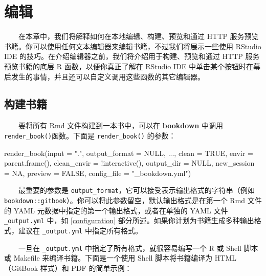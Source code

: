 \documentclass[
  12pt,
]{krantz}
\newenvironment{Shaded}{\begin{snugshade}}{\end{snugshade}}
\newcommand{\AttributeTok}[1]{\textcolor[rgb]{0.77,0.63,0.00}{#1}}
\newcommand{\ConstantTok}[1]{\textcolor[rgb]{0.00,0.00,0.00}{#1}}
\newcommand{\FunctionTok}[1]{\textcolor[rgb]{0.00,0.00,0.00}{#1}}
\newcommand{\NormalTok}[1]{#1}
\newcommand{\SpecialCharTok}[1]{\textcolor[rgb]{0.00,0.00,0.00}{#1}}
\newcommand{\StringTok}[1]{\textcolor[rgb]{0.31,0.60,0.02}{#1}}
\theoremstyle{definition}
\theoremstyle{definition}
\theoremstyle{definition}
\theoremstyle{definition}
\theoremstyle{remark}
\begin{document}
\hypertarget{editing}{%
\chapter{编辑}\label{editing}}

  在本章中，我们将解释如何在本地编辑、构建、预览和通过 HTTP 服务预览书籍。你可以使用任何文本编辑器来编辑书籍，不过我们将展示一些使用 RStudio IDE 的技巧。在介绍编辑器之前，我们将介绍用于构建、预览和通过 HTTP 服务预览书籍的底层 R 函数，以便你真正了解在 RStudio IDE 中单击某个按钮时在幕后发生的事情，并且还可以自定义调用这些函数的其它编辑器。

\hypertarget{ux6784ux5efaux4e66ux7c4d}{%
\section{构建书籍}\label{ux6784ux5efaux4e66ux7c4d}}

  要将所有 Rmd 文件构建到一本书中，可以在 \textbf{bookdown} 中调用 \texttt{render\_book()}函数。下面是 \texttt{render\_book()} 的参数：

\begin{Shaded}
\begin{Highlighting}[]
\FunctionTok{render\_book}\NormalTok{(}\AttributeTok{input =} \StringTok{"."}\NormalTok{, }\AttributeTok{output\_format =} \ConstantTok{NULL}\NormalTok{, ...,}
  \AttributeTok{clean =} \ConstantTok{TRUE}\NormalTok{, }\AttributeTok{envir =} \FunctionTok{parent.frame}\NormalTok{(),}
  \AttributeTok{clean\_envir =} \SpecialCharTok{!}\FunctionTok{interactive}\NormalTok{(), }\AttributeTok{output\_dir =} \ConstantTok{NULL}\NormalTok{,}
  \AttributeTok{new\_session =} \ConstantTok{NA}\NormalTok{, }\AttributeTok{preview =} \ConstantTok{FALSE}\NormalTok{,}
  \AttributeTok{config\_file =} \StringTok{"\_bookdown.yml"}\NormalTok{)}
\end{Highlighting}
\end{Shaded}

  最重要的参数是 \texttt{output\_format}，它可以接受表示输出格式的字符串（例如 \texttt{\textquotesingle{}bookdown::gitbook\textquotesingle{}}）。你可以将此参数留空，默认输出格式是在第一个 Rmd 文件的 YAML 元数据中指定的第一个输出格式，或者在单独的 YAML 文件 \texttt{\_output.yml} 中，如 \ref{configuration} 部分所述。如果你计划为书籍生成多种输出格式，建议在 \texttt{\_output.yml} 中指定所有格式。

  一旦在 \texttt{\_output.yml} 中指定了所有格式，就很容易编写一个 R 或 Shell 脚本或 Makefile 来编译书籍。下面是一个使用 Shell 脚本将书籍编译为 HTML（GitBook 样式）和 PDF 的简单示例：
\end{document}
